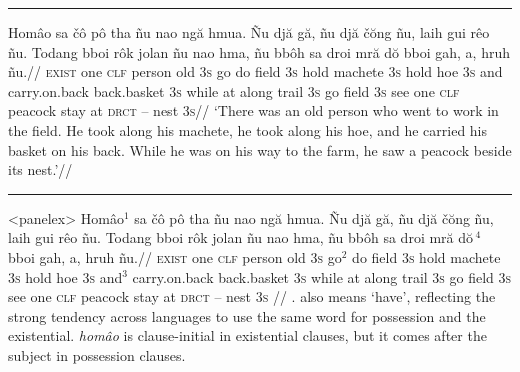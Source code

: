 \documentclass[12pt]{article}
\begin{document}
\filbreak\hrule\medskip

\begingroup
\ex[glftpos=right,glhangstyle=none]
\let\\=\textsc
\begingl
\gla
Hom\^{a}o sa \v{c}\^{o} p\^{o} tha  \~{n}u nao ng\u{a} hmua. \~{N}u
dj\u{a} g\u{a}, \~{n}u dj\u{a} \v{c}\u{o}ng \~{n}u, laih gui r\^{e}o
\~{n}u. Todang bboi r\^{o}k jolan \~{n}u nao hma, \~{n}u bb\^{o}h sa
droi mr\u{a} d\u{o} bboi gah, a, hruh \~{n}u.//
\glb
\\{exist} one \\{clf} person old \\{3s} go do field \\{3s} hold
machete \\{3s} hold hoe \\{3s} and carry.on.back back.basket \\{3s}
while at along trail \\{3s} go field \\{3s} see one \\{clf} peacock
stay at \\{drct} -- nest \\{3s}//
\glft
`There was an old person who went to work in the field. He took
along his machete, he took along his hoe, and he carried his
basket on his back. While he was on his way to the farm, he saw a
peacock beside its nest.'//
\endgl
\xe
\endgroup
\bigskip

\filbreak\hrule\medskip

\begingroup
\ex[everypanel=\footnotesize]<panelex>
\let\\=\textsc
\beginglpanel[ssratio=.5,glhangstyle=none]
\gla Hom\^{a}o$^1$ sa \v{c}\^{o} p\^{o} tha  \~{n}u nao ng\u{a}
hmua. \~{N}u dj\u{a} g\u{a}, \~{n}u dj\u{a} \v{c}\u{o}ng \~{n}u,
laih gui r\^{e}o \~{n}u. Todang bboi r\^{o}k jolan \~{n}u nao
hma, \~{n}u bb\^{o}h sa droi mr\u{a} d\u{o}$\,^4$ bboi gah, a, hruh
\~{n}u.//
\glb \\{exist} one \\{clf} person old \\{3s} go$^2$ do field
\\{3s} hold machete \\{3s} hold hoe \\{3s} and$^3$ carry.on.back
back.basket \\{3s} while at along trail \\{3s} go field \\{3s}
see one \\{clf} peacock stay at \\{drct} -- nest \\{3s}
//
. also means `have', reflecting the
strong tendency across languages to use the same word for
possession and the existential. {\it hom\^{a}o} is clause-initial
in existential clauses, but it comes after the subject in
possession clauses.
\end{document}
